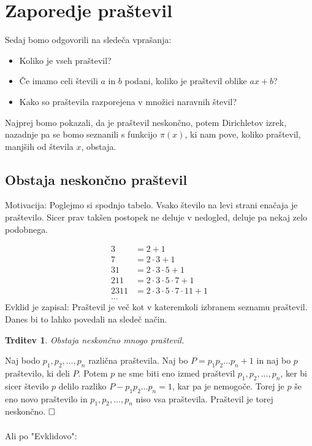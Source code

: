 \documentclass[a4paper,12pt]{article}
\def\qed{$\hfill\Box$}   %
\newtheorem{trditev}{Trditev}
\begin{document}
\section{Zaporedje praštevil}
Sedaj bomo odgovorili na sledeča vprašanja:
\begin{itemize}
	\item Koliko je vseh praštevil?
	\item Če imamo celi števili $a$ in $b$ podani, koliko je praštevil oblike $ax + b$?
	\item Kako so praštevila razporejena v množici naravnih števil?
\end{itemize}
Najprej bomo pokazali, da je praštevil neskončno, potem Dirichletov izrek, nazadnje
pa se bomo seznanili s funkcijo $\pi(x)$, ki nam pove, koliko praštevil, manjših od števila $x$, obstaja.

\subsection{Obstaja neskončno praštevil}

Motivacija: Poglejmo si spodnjo tabelo. Vsako število na levi strani enačaja je praštevilo. Sicer prav takšen postopek ne deluje v nedogled, deluje pa nekaj zelo podobnega.

\begin{align*}
3 &= 2 + 1 \\
7 &= 2 \cdot 3 + 1 \\
31 &= 2\cdot 3\cdot 5+1 \\
211 &= 2\cdot 3\cdot 5\cdot 7+1 \\
2311 &= 2\cdot 3\cdot 5\cdot 7\cdot 11+1 \\
\ldots
\end{align*}
Evklid je zapisal: Praštevil je več kot v kateremkoli izbranem seznamu praštevil.
Danes bi to lahko povedali na sledeč način.

\begin{trditev}
	Obstaja neskončno mnogo praštevil.
\end{trditev}

	Naj bodo $p_1, p_2, \ldots, p_n$ različna praštevila. Naj bo $P = p_1p_2\ldots p_n + 1$ in
	naj bo $p$ praštevilo, ki deli $P$. Potem $p$ ne sme biti eno izmed praštevil
	$p_1, p_2, \ldots, p_n$, ker bi sicer število $p$ delilo razliko $P-p_1p_2\ldots p_n = 1$, kar pa je
	nemogoče. Torej je $p$ še eno novo praštevilo in $p_1, p_2, \ldots, p_n$ niso vsa praštevila.
	Praštevil je torej neskončno.
\qed
\\
\\
Ali po "Evklidovo":
\end{document}
